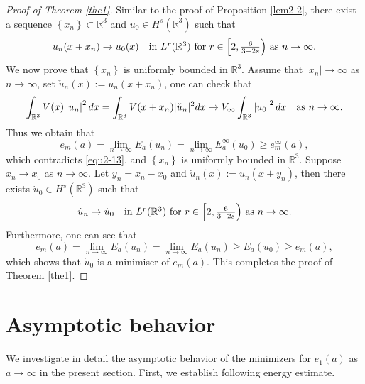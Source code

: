 \documentclass[reqno, 11pt]{amsart} %
\numberwithin{equation}{section}
\begin{document}
\begin{proof}[Proof of Theorem \ref{the1}]
		Similar to the proof of Proposition \ref{lem2-2}, there exist a sequence $\left\lbrace x_{n}\right\rbrace \subset\mathbb{R}^{3}$ and $u_{0}\in H^{s}(\mathbb{R}^{3})$ such that
		\begin{equation*}
			u_{n}(x+x_{n})\rightarrow u_{0}(x)\quad  \hbox{in $L^{r}(\mathbb{R}^{3})$ for $r\in \left[ 2, \frac{6}{3-2s}\right) $ as $n\rightarrow\infty$}.
		\end{equation*}
		We now prove that $\left\lbrace x_{n}\right\rbrace $ is uniformly bounded in $\mathbb{R}^{3}$. Assume that $|x_{n}| \rightarrow\infty$ as $n\rightarrow\infty$, set $\check{u}_{n}(x):=u_{n}(x+x_{n})$, one can check that
		\begin{equation*}
			\int_{\mathbb{R}^{3}}V(x) \left| u_{n}\right| ^{2}dx=\int_{\mathbb{R}^{3}}V(x+x_{n}) |\check{u}_{n}|^{2}dx\rightarrow V_{\infty}	\int_{\mathbb{R}^{3}} \left| u_{0}\right| ^{2}dx\quad  \hbox{as $n\rightarrow\infty$}.
		\end{equation*}
		Thus we obtain that
		\begin{equation*}
			e_{m}(a)=\lim _{n\rightarrow\infty}E_{a}(u_{n})=\lim _{n\rightarrow\infty}E^{\infty}_{a}(u_{0})\geq e^{\infty}_{m}(a),
		\end{equation*}
		which contradicts \eqref{equ2-13}, and $\left\lbrace x_{n}\right\rbrace $ is uniformly bounded in $\mathbb{R}^{3}$. Suppose $x_{n}\rightarrow x_{0}$ as $n\rightarrow\infty$. Let $y_{n}=x_{n}-x_{0}$ and $\dot{u}_{n}(x):=u_{n}(x+y_{n})$, then there exists $\dot{u}_{0}\in H^{s}(\mathbb{R}^{3})$ such that
		\begin{equation*}
			\dot{u}_{n}\rightarrow \dot{u}_{0}\quad  \hbox{in $L^{r}(\mathbb{R}^{3})$ for $r\in \left[ 2, \frac{6}{3-2s}\right) $ as $n\rightarrow\infty$}.
		\end{equation*}
		Furthermore, one can see that
		\begin{equation*}
			e_{m}(a)=\lim _{n\rightarrow\infty}E_{a}(u_{n})=\lim _{n\rightarrow\infty}E_{a}(	\dot{u}_{n})\geq E_{a}(	\dot{u}_{0}) \geq e_{m}(a),
		\end{equation*}
		which shows that $\dot{u}_{0}$ is a minimiser of $e_{m}(a)$. This completes the proof of Theorem \ref{the1}.
	\end{proof}
	
	\section{Asymptotic behavior }\label{sec 3}
	
	We investigate in detail the asymptotic behavior of the minimizers for $e_{1}(a)$ as $a\rightarrow\infty$ in the present section. First, we establish following energy estimate.
	
\end{document}
